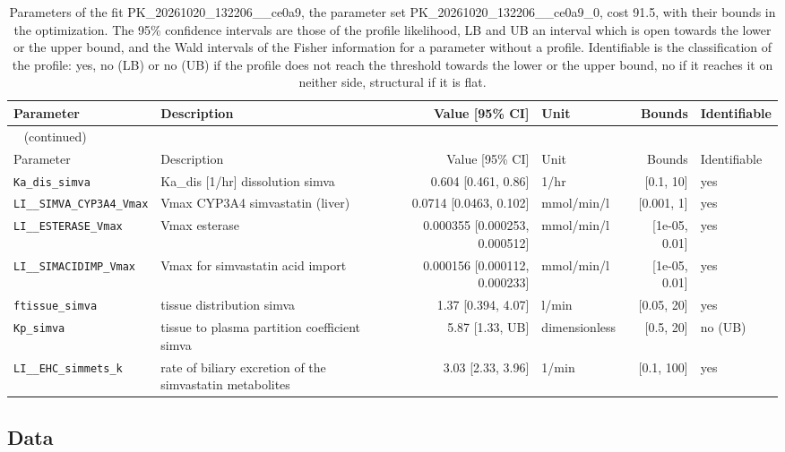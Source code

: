 \begin{longtable}{llrlrl}
\caption{Parameters of the fit PK\_20261020\_132206\_\_ce0a9, the parameter set PK\_20261020\_132206\_\_ce0a9\_0, cost 91.5, with their bounds in the optimization. The 95\% confidence intervals are those of the profile likelihood, LB and UB an interval which is open towards the lower or the upper bound, and the Wald intervals of the Fisher information for a parameter without a profile. Identifiable is the classification of the profile: yes, no (LB) or no (UB) if the profile does not reach the threshold towards the lower or the upper bound, no if it reaches it on neither side, structural if it is flat.}\label{tab:parameters:PK_20261020_132206__ce0a9} \\
\toprule
Parameter & Description & Value [95\% CI] & Unit & Bounds & Identifiable \\
\midrule
\endfirsthead
\multicolumn{6}{l}{\small\tablename~\thetable{} (continued)} \\
\toprule
Parameter & Description & Value [95\% CI] & Unit & Bounds & Identifiable \\
\midrule
\endhead
\bottomrule
\endlastfoot
\texttt{Ka\_dis\_simva} & Ka\_dis [1/hr] dissolution simva & 0.604 [0.461, 0.86] & 1/hr & [0.1, 10] & yes \\
\texttt{LI\_\_SIMVA\_CYP3A4\_Vmax} & Vmax CYP3A4 simvastatin (liver) & 0.0714 [0.0463, 0.102] & mmol/min/l & [0.001, 1] & yes \\
\texttt{LI\_\_ESTERASE\_Vmax} & Vmax esterase & 0.000355 [0.000253, 0.000512] & mmol/min/l & [1e-05, 0.01] & yes \\
\texttt{LI\_\_SIMACIDIMP\_Vmax} & Vmax for simvastatin acid import & 0.000156 [0.000112, 0.000233] & mmol/min/l & [1e-05, 0.01] & yes \\
\texttt{ftissue\_simva} & tissue distribution simva & 1.37 [0.394, 4.07] & l/min & [0.05, 20] & yes \\
\texttt{Kp\_simva} & tissue to plasma partition coefficient simva & 5.87 [1.33, UB] & dimensionless & [0.5, 20] & no (UB) \\
\texttt{LI\_\_EHC\_simmets\_k} & rate of biliary excretion of the simvastatin metabolites & 3.03 [2.33, 3.96] & 1/min & [0.1, 100] & yes \\
\end{longtable}

\subsection{Data}

